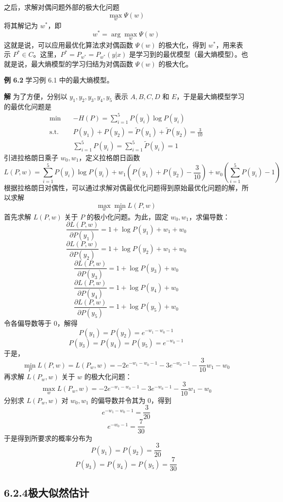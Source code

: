 \documentclass[UTF8,12pt,a4paper,fontset=fandol]{ctexart}
\begin{document}
之后，求解对偶问题外部的极大化问题
\begin{equation}
\max_w\Psi(w)
\tag{6.24}
\end{equation}
将其解记为 $w^*$，即
\begin{equation}
w^*=\arg\max_w\Psi(w)
\tag{6.25}
\end{equation}
这就是说，可以应用最优化算法求对偶函数 $\Psi(w)$ 的极大化，得到 $w^*$，用来表示 $P^*\in C$。这里，$P^*=P_{w^*}=P_{w^*}(y|x)$ 是学习到的最优模型（最大熵模型）。也就是说，最大熵模型的学习归结为对偶函数 $\Psi(w)$ 的极大化。

\noindent\textbf{例 6.2}\quad
学习例 6.1 中的最大熵模型。

\noindent\textbf{解}\quad
为了方便，分别以 $y_1,y_2,y_3,y_4,y_5$ 表示 $A,B,C,D$ 和 $E$，于是最大熵模型学习的最优化问题是
\[
\begin{aligned}
\min\quad &-H(P)=\sum_{i=1}^5 P(y_i)\log P(y_i)\\
\mathrm{s.t.}\quad &P(y_1)+P(y_2)=\tilde{P}(y_1)+\tilde{P}(y_2)=\frac{3}{10}\\
&\sum_{i=1}^5 P(y_i)=\sum_{i=1}^5\tilde{P}(y_i)=1
\end{aligned}
\]
引进拉格朗日乘子 $w_0,w_1$，定义拉格朗日函数
\[
L(P,w)=\sum_{i=1}^5P(y_i)\log P(y_i)+w_1\left(P(y_1)+P(y_2)-\frac{3}{10}\right)
+w_0\left(\sum_{i=1}^5P(y_i)-1\right)
\]
根据拉格朗日对偶性，可以通过求解对偶最优化问题得到原始最优化问题的解，所以求解
\[
\max_w\min_P L(P,w)
\]
首先求解 $L(P,w)$ 关于 $P$ 的极小化问题。为此，固定 $w_0,w_1$，求偏导数：
\[
\frac{\partial L(P,w)}{\partial P(y_1)}=1+\log P(y_1)+w_1+w_0
\]
\[
\frac{\partial L(P,w)}{\partial P(y_2)}=1+\log P(y_2)+w_1+w_0
\]
\[
\frac{\partial L(P,w)}{\partial P(y_3)}=1+\log P(y_3)+w_0
\]
\[
\frac{\partial L(P,w)}{\partial P(y_4)}=1+\log P(y_4)+w_0
\]
\[
\frac{\partial L(P,w)}{\partial P(y_5)}=1+\log P(y_5)+w_0
\]
令各偏导数等于 0，解得
\[
P(y_1)=P(y_2)=e^{-w_1-w_0-1}
\]
\[
P(y_3)=P(y_4)=P(y_5)=e^{-w_0-1}
\]
于是，
\[
\min_P L(P,w)=L(P_w,w)=-2e^{-w_1-w_0-1}-3e^{-w_0-1}-\frac{3}{10}w_1-w_0
\]
再求解 $L(P_w,w)$ 关于 $w$ 的极大化问题：
\[
\max_w L(P_w,w)=-2e^{-w_1-w_0-1}-3e^{-w_0-1}-\frac{3}{10}w_1-w_0
\]
分别求 $L(P_w,w)$ 对 $w_0,w_1$ 的偏导数并令其为 0，得到
\[
e^{-w_1-w_0-1}=\frac{3}{20}
\]
\[
e^{-w_0-1}=\frac{7}{30}
\]
于是得到所要求的概率分布为
\[
P(y_1)=P(y_2)=\frac{3}{20}
\]
\[
P(y_3)=P(y_4)=P(y_5)=\frac{7}{30}
\]

\subsection*{6.2.4\quad 极大似然估计}
\end{document}
